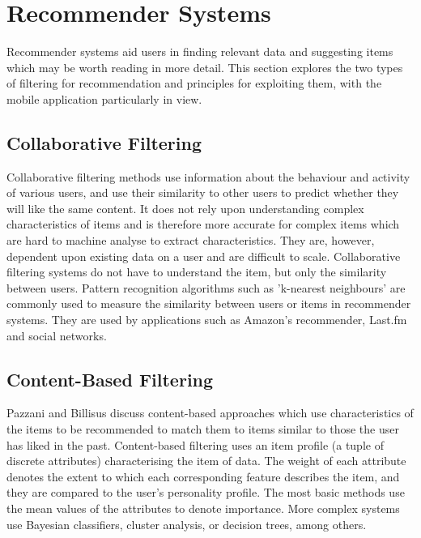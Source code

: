 \section{Recommender Systems}

Recommender systems aid users in finding relevant data and suggesting items which may be worth reading in more detail. This section explores the two types of filtering for recommendation and principles for exploiting them, with the mobile application particularly in view.

\subsection{Collaborative Filtering}

Collaborative filtering methods \cite{CollaborativeRecommenderGoldberg} use information about the behaviour and activity of various users, and use their similarity to other users to predict whether they will like the same content. It does not rely upon understanding complex characteristics of items and is therefore more accurate for complex items which are hard to machine analyse to extract characteristics. They are, however, dependent upon existing data on a user and are difficult to scale. Collaborative filtering systems do not have to understand the item, but only the similarity between users. Pattern recognition algorithms such as 'k-nearest neighbours' are commonly used to measure the similarity between users or items in recommender systems. They are used by applications such as Amazon's recommender, Last.fm and social networks. 

\subsection{Content-Based Filtering}

Pazzani and Billisus discuss content-based approaches \cite{ContentRecommenderPazzani} which use characteristics of the items to be recommended to match them to items similar to those the user has liked in the past. Content-based filtering uses an item profile (a tuple of discrete attributes) characterising the item of data. The weight of each attribute denotes the extent to which each corresponding feature describes the item, and they are compared to the user's personality profile. The most basic methods use the mean values of the attributes to denote importance. More complex systems use Bayesian classifiers, cluster analysis, or decision trees, among others.


